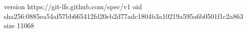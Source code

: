 version https://git-lfs.github.com/spec/v1
oid sha256:0885ea54af57bb665412fd20eb2d77adc1804b3a10219a595a6b0501f1c2a863
size 11068

